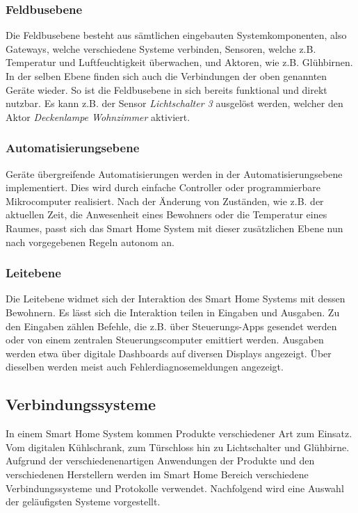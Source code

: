 \subsubsection{Feldbusebene}

Die Feldbusebene besteht aus sämtlichen eingebauten Systemkomponenten, also Gateways, welche verschiedene Systeme verbinden, Sensoren, welche z.B. Temperatur und Luftfeuchtigkeit überwachen, und Aktoren, wie z.B. Glühbirnen.
In der selben Ebene finden sich auch die Verbindungen der oben genannten Geräte wieder.
So ist die Feldbusebene in sich bereits funktional und direkt nutzbar.
Es kann z.B. der Sensor \textit{Lichtschalter 3} ausgelöst werden, welcher den Aktor \textit{Deckenlampe Wohnzimmer} aktiviert.

\subsubsection{Automatisierungsebene}

Geräte übergreifende Automatisierungen werden in der Automatisierungsebene implementiert.
Dies wird durch einfache Controller oder programmierbare Mikrocomputer realisiert.
Nach der Änderung von Zuständen, wie z.B. der aktuellen Zeit, die Anwesenheit eines Bewohners oder die Temperatur eines Raumes, passt sich das Smart Home System mit dieser zusätzlichen Ebene nun nach vorgegebenen Regeln autonom an.

\subsubsection{Leitebene}

Die Leitebene widmet sich der Interaktion des Smart Home Systems mit dessen Bewohnern.
Es lässt sich die Interaktion teilen in Eingaben und Ausgaben.
Zu den Eingaben zählen Befehle, die z.B. über Steuerungs-Apps gesendet werden oder von einem zentralen Steuerungscomputer emittiert werden.
Ausgaben werden etwa über digitale Dashboards auf diversen Displays angezeigt.
Über dieselben werden meist auch Fehlerdiagnosemeldungen angezeigt.

\subsection{Verbindungssysteme}

In einem Smart Home System kommen Produkte verschiedener Art zum Einsatz.
Vom digitalen Kühlschrank, zum Türschloss hin zu Lichtschalter und Glühbirne.
Aufgrund der verschiedenenartigen Anwendungen der Produkte und den verschiedenen Herstellern werden im Smart Home Bereich verschiedene Verbindungssysteme und Protokolle verwendet.
Nachfolgend wird eine Auswahl der geläufigsten Systeme vorgestellt.

